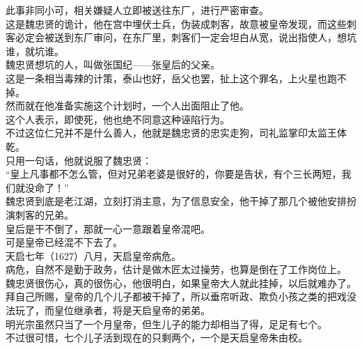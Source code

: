 \begin{multicols}{\theparacolNo}
此事非同小可，相关嫌疑人立即被送往东厂，进行严密审查。\\

这是魏忠贤的诡计，他在宫中埋伏士兵，伪装成刺客，故意被皇帝发现，而这些刺客必定会被送到东厂审问，在东厂里，刺客们一定会坦白从宽，说出指使人，想坑谁，就坑谁。\\

魏忠贤想坑的人，叫做张国纪——张皇后的父亲。\\

这是一条相当毒辣的计策，泰山也好，岳父也罢，扯上这个罪名，上火星也跑不掉。\\

然而就在他准备实施这个计划时，一个人出面阻止了他。\\

这个人表示，即使死，他也绝不同意这种诬陷行为。\\

不过这位仁兄并不是什么善人，他就是魏忠贤的忠实走狗，司礼监掌印太监王体乾。\\

只用一句话，他就说服了魏忠贤：\\

“皇上凡事都不怎么管，但对兄弟老婆是很好的，你要是告状，有个三长两短，我们就没命了！”\\

魏忠贤到底是老江湖，立刻打消主意，为了信息安全，他干掉了那几个被他安排扮演刺客的兄弟。\\

皇后是干不倒了，那就一心一意跟着皇帝混吧。\\

可是皇帝已经混不下去了。\\

天启七年（1627）八月，天启皇帝病危。\\

病危，自然不是勤于政务，估计是做木匠太过操劳，也算是倒在了工作岗位上。\\

魏忠贤很伤心，真的很伤心，他很明白，如果皇帝大人就此挂掉，以后就难办了。\\

拜自己所赐，皇帝的几个儿子都被干掉了，所以垂帘听政、欺负小孩之类的把戏没法玩了，而皇位继承者，将是天启皇帝的弟弟。\\

明光宗虽然只当了一个月皇帝，但生儿子的能力却相当了得，足足有七个。\\

不过很可惜，七个儿子活到现在的只剩两个，一个是天启皇帝朱由校。\\


\end{multicols}
